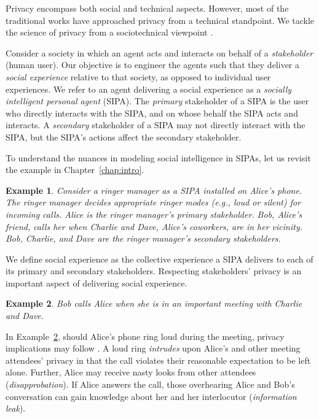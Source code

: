 \documentclass[11pt,          %
               phd,           %
               onehalfspacing %
               ]{ncsuthesis}
\newtheorem{example}{Example}
\begin{document}
Privacy encompass both social and technical aspects. However, most of
the traditional works have approached privacy from a technical
standpoint. We tackle the science of privacy from a sociotechnical
viewpoint \citep{Kafali-IS16-Revani,WWW-16:IOSE}.

Consider a society in which an agent acts and interacts on behalf of a
\emph{stakeholder} (human user). Our objective is to engineer the agents
such that they deliver a \emph{social experience} relative to that
society, as opposed to individual user experiences. We refer to an agent
delivering a social experience as a \emph{socially intelligent personal
agent} (SIPA). The \emph{primary} stakeholder of a SIPA is the user who
directly interacts with the SIPA, and on whose behalf the SIPA acts and
interacts. A \emph{secondary} stakeholder of a SIPA may not directly
interact with the SIPA, but the SIPA's actions affect the secondary
stakeholder.

To understand the nuances in modeling social intelligence in SIPAs, 
let us revisit the example in Chapter~\ref{chap:intro}. 

\begin{example} \label{ex:ringer-meeting} Consider a ringer manager as a
SIPA installed on Alice's phone. The ringer manager decides appropriate
ringer modes (e.g., loud or silent) for incoming calls. Alice is the
ringer manager's primary stakeholder. Bob, Alice's friend, calls her
when Charlie and Dave, Alice's coworkers, are in her vicinity. Bob,
Charlie, and Dave are the ringer manager's secondary stakeholders.
\end{example}


We define social experience as the collective experience a SIPA delivers
to each of its primary and secondary stakeholders. Respecting
stakeholders' privacy is an important aspect of delivering social
experience.

\begin{example} \label{ex:ringer-implications} Bob calls Alice when she
is in an important meeting with Charlie and Dave. \end{example}

In Example~\ref{ex:ringer-implications}, should Alice's phone ring loud
during the meeting, privacy implications may follow
\citep{solove-2006-taxonomy,Murukannaiah-IC16-Engineering}. A loud ring
\emph{intrudes} upon Alice's and other meeting attendees' privacy in
that the call violates their reasonable expectation to be left alone.
Further, Alice may receive nasty looks from other attendees
(\emph{disapprobation}). If Alice answers the call, those overhearing
Alice and Bob's conversation can gain knowledge about her and her
interlocutor (\emph{information leak}).
\end{document}
